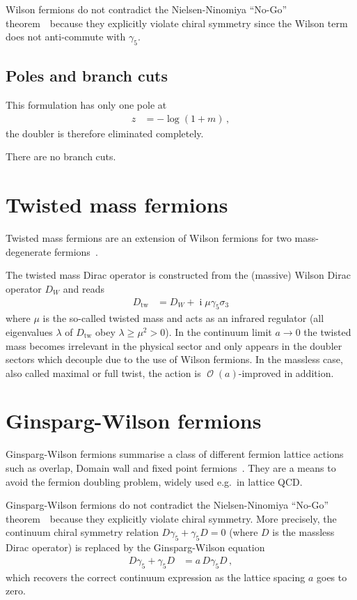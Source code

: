 \documentclass[a4paper]{article}
\DeclareMathOperator{\im}{i}
\DeclareMathOperator{\ord}{\mathcal{O}}
\newcommand{\ordnung}[1]{\ensuremath{\ord\left(#1\right)}}
\newcommand{\nnt}{Nielsen-Ninomiya ``No-Go'' theorem~\cite{NIELSEN1981219}}
\begin{document}
	Wilson fermions do not contradict the \nnt\ because they explicitly violate chiral symmetry since the Wilson term does not anti-commute with $\gamma_5$.
	
	\subsection{Poles and branch cuts}
	This formulation has only one pole at
	\begin{align}
		z &= -\log\left(1+m\right)\,,
	\end{align}
	the doubler is therefore eliminated completely.
	
	There are no branch cuts.
	
	\section{Twisted mass fermions}
	Twisted mass fermions are an extension of Wilson fermions for two mass-degenerate fermions~\cite{twisted_mass_2000,Gattringer:2010zz}.
	
	The twisted mass Dirac operator is constructed from the (massive) Wilson Dirac operator $D_W$ and reads
	\begin{align}
		D_\text{tw} &= D_W + \im\mu\gamma_5\sigma_3
	\end{align}
	where $\mu$ is the so-called twisted mass and acts as an infrared regulator (all eigenvalues $\lambda$ of $D_\text{tw}$ obey $\lambda\ge\mu^2>0$). In the continuum limit $a\rightarrow0$ the twisted mass becomes irrelevant in the physical sector and only appears in the doubler sectors which decouple due to the use of Wilson fermions. In the massless case, also called maximal or full twist, the action is $\ordnung{a}$-improved in addition.
		
	\section{Ginsparg-Wilson fermions}
	Ginsparg-Wilson fermions summarise a class of different fermion lattice actions such as overlap, Domain wall and fixed point fermions~\cite{Ginsparg_Wilson,Gattringer:2010zz}. They are a means to avoid the fermion doubling problem, widely used e.g.\ in lattice QCD.
	
	Ginsparg-Wilson fermions do not contradict the \nnt\ because they explicitly violate chiral symmetry. More precisely, the continuum chiral symmetry relation $D\gamma_5+\gamma_5 D=0$ (where $D$ is the massless Dirac operator) is replaced by the Ginsparg-Wilson equation
	\begin{align}
		D\gamma_5 + \gamma_5 D &= a\,D\gamma_5 D\,,\label{eq:ginsparg_wilson_eq}
	\end{align}
	which recovers the correct continuum expression as the lattice spacing $a$ goes to zero.
	
\end{document}
